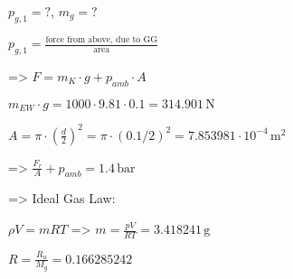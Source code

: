 \( p_{g,1} = ? \), \( m_g = ? \)  

\( p_{g,1} = \frac{\text{force from above, due to GG}}{\text{area}} \)  

=> \( F = m_K \cdot g + p_{amb} \cdot A \)  

\( m_{EW} \cdot g = 1000 \cdot 9.81 \cdot 0.1 = 314.901 \, \text{N} \)  

\( A = \pi \cdot \left(\frac{d}{2}\right)^2 = \pi \cdot \left(0.1 / 2\right)^2 = 7.853981 \cdot 10^{-4} \, \text{m}^2 \)  

=> \( \frac{F_r}{A} + p_{amb} = 1.4 \, \text{bar} \)  

=> Ideal Gas Law:  

\( \rho V = m R T \) => \( m = \frac{p V}{R T} = 3.418241 \, \text{g} \)  

\( R = \frac{R_u}{M_g} = 0.166285242 \)